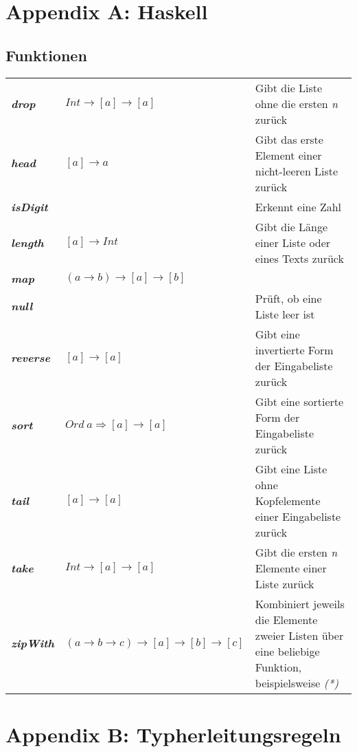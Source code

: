 \section{Appendix A: Haskell}

\subsection{Funktionen}

\begin{table}[h]
\begin{tabularx}{\textwidth}{l|X|X}
	\textbf{\textit{drop}} & \(Int \rightarrow [a] \rightarrow [a]\) & Gibt die Liste ohne die ersten \textit{n} zurück \\
	\textbf{\textit{head}} & \([a] \rightarrow a\) & Gibt das erste Element einer nicht-leeren Liste zurück \\
	\textbf{\textit{isDigit}} & & Erkennt eine Zahl \\
	\textbf{\textit{length}} & \([a] \rightarrow Int\) & Gibt die Länge einer Liste oder eines Texts zurück \\
	\textbf{\textit{map}} & \((a \rightarrow b) \rightarrow [a] \rightarrow [b]\) & \\
	\textbf{\textit{null}} & & Prüft, ob eine Liste leer ist \\
	\textbf{\textit{reverse}} & \([a] \rightarrow [a]\) & Gibt eine invertierte Form der Eingabeliste zurück \\
	\textbf{\textit{sort}} & \(Ord~a \Rightarrow [a] \rightarrow [a]\) & Gibt eine sortierte Form der Eingabeliste zurück \\
	\textbf{\textit{tail}} & \([a] \rightarrow [a]\) & Gibt eine Liste ohne Kopfelemente einer Eingabeliste zurück \\
	\textbf{\textit{take}} & \(Int \rightarrow [a] \rightarrow [a]\) & Gibt die ersten \textit{n} Elemente einer Liste zurück \\
	\textbf{\textit{zipWith}} & \((a \rightarrow b \rightarrow c) \rightarrow [a] \rightarrow [b] \rightarrow [c]\) & Kombiniert jeweils die Elemente zweier Listen über eine beliebige Funktion, beispielsweise \textit{(*)} \\
\end{tabularx}
\end{table}

\section{Appendix B: Typherleitungsregeln}

